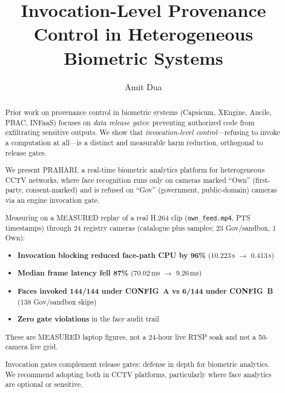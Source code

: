 \documentclass[sigplan,review]{acmart}
\begin{document}
\title{Invocation-Level Provenance Control in Heterogeneous Biometric Systems}

\author{Amit Dua}

\begin{abstract}
Prior work on provenance control in biometric systems (Capsicum, XEngine, Ancile, PBAC, INFaaS)
focuses on \emph{data release gates}: preventing authorized code from exfiltrating sensitive outputs.
We show that \emph{invocation-level control}—refusing to invoke a computation at all—is a distinct
and measurable harm reduction, orthogonal to release gates.

We present PRAHARI, a real-time biometric analytics platform for heterogeneous CCTV networks,
where face recognition runs only on cameras marked ``Own'' (first-party, consent-marked) and is
refused on ``Gov'' (government, public-domain) cameras via an engine invocation gate.

Measuring on a MEASURED replay of a real H.264 clip (\texttt{own\_feed.mp4}, PTS timestamps)
through 24 registry cameras (catalogue plus samples; 23 Gov/sandbox, 1 Own):
\begin{itemize}
  \item \textbf{Invocation blocking reduced face-path CPU by 96\%} (10.223\,s $\to$ 0.413\,s)
  \item \textbf{Median frame latency fell 87\%} (70.02\,ms $\to$ 9.26\,ms)
  \item \textbf{Faces invoked 144/144 under CONFIG~A vs 6/144 under CONFIG~B} (138 Gov/sandbox skips)
  \item \textbf{Zero gate violations} in the face audit trail
\end{itemize}
These are MEASURED laptop figures, not a 24-hour live RTSP soak and not a 50-camera live grid.

Invocation gates complement release gates: defense in depth for biometric analytics. We recommend
adopting both in CCTV platforms, particularly where face analytics are optional or sensitive.
\end{abstract}
\end{document}

